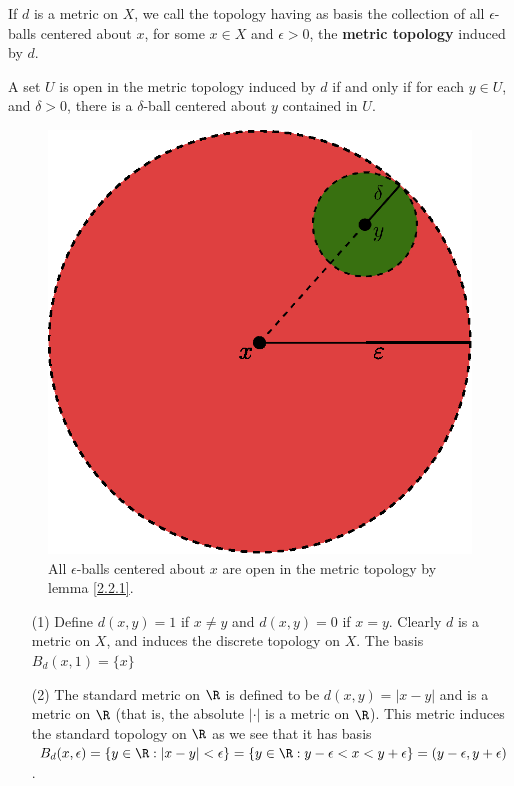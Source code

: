 \begin{definition}
    If $d$ is a metric on  $X$, we call the topology having as basis the collection of all
    $\epsilon$-balls centered about  $x$, for some  $x \in X$ and  $\epsilon>0$, the \textbf {metric
    topology} induced by $d$.
\end{definition}

\begin{corollary}
    A set $U$ is open in the metric topology induced by  $d$ if and only if for each  $y \in U$, and
     $\delta>0$, there is a  $\delta$-ball centered about $y$ contained in  $U$.
\end{corollary}

\begin{figure}[h]
    \centering
    \includegraphics[scale = 0.5]{Figures/Chapter2/open_balls.eps}
    \caption{All $\epsilon$-balls centered about  $x$ are open in the metric topology by lemma
    \ref{2.2.1}.}
    \label{fig2.1}
\end{figure}

\begin{example}
    \begin{enumerate}
        \item[(1)] Define $d(x,y)=1$ if $x \neq y$ and  $d(x,y)=0$ if $x=y$. Clearly  $d$ is a metric on
            $X$, and induces the discrete topology on  $X$. The basis  $B_d(x,1)=\{x\}$

        \item[(2)] The standard metric on $\R$ is defined to be  $d(x,y)=|x-y|$ and is a metric on $\R$
            (that is, the absolute $|\cdot|$ is a metric on  $\R$). This metric
            induces the standard topology on $\R$ as we see that it has basis
            $B_d(x,\epsilon)=\{y \in \R: |x-y|<\epsilon\}=\{y \in \R:
            y-\epsilon<x<y+\epsilon\}=(y-\epsilon,y+\epsilon)$.
    \end{enumerate}
\end{example}

